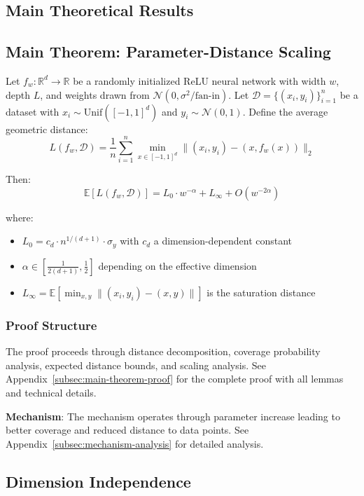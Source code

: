 \subsection{Main Theoretical Results}

\subsection{Main Theorem: Parameter-Distance Scaling}

\begin{theorem}
\label{thm:main}
Let $f_w: \mathbb{R}^d \to \mathbb{R}$ be a randomly initialized ReLU neural network with width $w$, depth $L$, and weights drawn from $\mathcal{N}(0, \sigma^2/\text{fan-in})$. Let $\mathcal{D} = \{(x_i, y_i)\}_{i=1}^n$ be a dataset with $x_i \sim \text{Unif}([-1,1]^d)$ and $y_i \sim \mathcal{N}(0,1)$. Define the average geometric distance:
$$L(f_w, \mathcal{D}) = \frac{1}{n} \sum_{i=1}^n \min_{x \in [-1,1]^d} \|(x_i, y_i) - (x, f_w(x))\|_2$$

Then:
$$\mathbb{E}[L(f_w, \mathcal{D})] = L_0 \cdot w^{-\alpha} + L_\infty + O(w^{-2\alpha})$$

where:
\begin{itemize}
    \item $L_0 = c_d \cdot n^{1/(d+1)} \cdot \sigma_y$ with $c_d$ a dimension-dependent constant
    \item $\alpha \in [\frac{1}{2(d+1)}, \frac{1}{2}]$ depending on the effective dimension
    \item $L_\infty = \mathbb{E}[\min_{x,y} \|(x_i, y_i) - (x,y)\|]$ is the saturation distance
\end{itemize}
\end{theorem}

\subsubsection{Proof Structure}

The proof proceeds through distance decomposition, coverage probability analysis, expected distance bounds, and scaling analysis. See Appendix~\ref{subsec:main-theorem-proof} for the complete proof with all lemmas and technical details.

\textbf{Mechanism}: The mechanism operates through parameter increase leading to better coverage and reduced distance to data points. See Appendix~\ref{subsec:mechanism-analysis} for detailed analysis.

\subsection{Dimension Independence}

